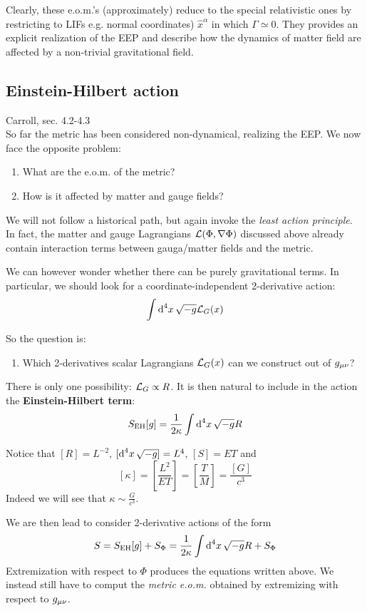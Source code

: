 \documentclass[../main/main.tex]{subfiles}
\begin{document}
Clearly, these e.o.m.'s (approximately) reduce to the special relativistic ones by restricting to LIFs e.g. normal coordinates) $\hat x^\alpha$ in which $\Gamma\simeq0$. They provides an explicit realization of the EEP and describe how the dynamics of matter field are affected by a non-trivial gravitational field. 

\subsection{Einstein-Hilbert action}

\textsf{Carroll, sec. 4.2-4.3}\\

So far the metric has been considered non-dynamical, realizing the EEP. We now face the opposite problem:
\begin{enumerate}[label=\textbullet]
\item What are the e.o.m. of the metric?
\item How is it affected by matter and gauge fields?
\end{enumerate}

We will not follow a historical path, but again invoke the \emph{least action principle}. In fact, the matter and gauge Lagrangians $\mathcal L(\Phi,\nabla\Phi)$ discussed above already contain interaction terms between gauga/matter fields and the metric. 

We can however wonder whether there can be purely gravitational terms. In particular, we should look for a coordinate-independent 2-derivative action:
\[\int\textup{d}^{4}{x}\,\sqrt{-g}\mathcal L_G(x)\]

So the question is:
\begin{enumerate}[label=\textbullet]
\item Which 2-derivatives scalar Lagrangians $\mathcal L_G(x)$ can we construct out of $g_{\mu \nu}$?
\end{enumerate}
There is only one possibility: $\mathcal L_G\propto R$. It is then natural to include in the action the \textbf{Einstein-Hilbert term}:
\[S_{\text{EH}}[g]=\frac1{2\kappa}\int\textup{d}^{4}{x}\,\sqrt{-g}R\]

Notice that $[R]=L^{-2}$, $[\textup{d}^{4}{x}\,\sqrt{-g}]=L^4$, $[S]=ET$ and
\[[\kappa]=\left[\frac{L^2}{ET}\right]=\left[\frac TM\right]=\frac{[G]}{c^3}\]
Indeed we will see that $\kappa\sim\frac{G}{c^3}$.

We are then lead to consider 2-derivative actions of the form 
\[S=S_{\text{EH}}[g]+S_\Phi=\frac1{2\kappa}\int\textup{d}^{4}{x}\,\sqrt{-g}R+S_\Phi\]
Extremization with respect to $\Phi$ produces the equations written above. We instead still have to comput the \emph{metric e.o.m.} obtained by extremizing with respect to $g_{\mu \nu}$. 
\end{document}
